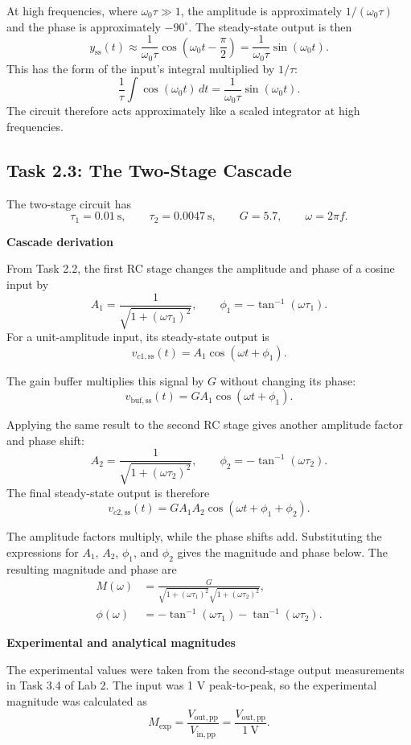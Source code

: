 \documentclass[11pt]{article}
\newcommand{\topic}[1]{\Needspace{4\baselineskip}\par\textbf{#1}\par\nopagebreak}
\begin{document}
At high frequencies, where $\omega_0\tau\gg1$, the amplitude is approximately $1/(\omega_0\tau)$ and the phase is approximately $-90^\circ$. The steady-state output is then
\[
  y_{\mathrm{ss}}(t)
  \approx\frac{1}{\omega_0\tau}\cos\left(\omega_0t-\frac{\pi}{2}\right)
  =\frac{1}{\omega_0\tau}\sin(\omega_0t).
\]
This has the form of the input's integral multiplied by $1/\tau$:
\[
  \frac{1}{\tau}\int\cos(\omega_0t)\,dt=\frac{1}{\omega_0\tau}\sin(\omega_0t).
\]
The circuit therefore acts approximately like a scaled integrator at high frequencies.

\clearpage
\subsection{Task 2.3: The Two-Stage Cascade}

The two-stage circuit has
\[
  \tau_1=0.01\ \text{s},\qquad
  \tau_2=0.0047\ \text{s},\qquad
  G=5.7,\qquad
  \omega=2\pi f.
\]

\topic{Cascade derivation}

From Task 2.2, the first RC stage changes the amplitude and phase of a cosine input by
\[
  A_1=\frac{1}{\sqrt{1+(\omega\tau_1)^2}},\qquad
  \phi_1=-\tan^{-1}(\omega\tau_1).
\]
For a unit-amplitude input, its steady-state output is
\[
  v_{c1,\mathrm{ss}}(t)=A_1\cos(\omega t+\phi_1).
\]

The gain buffer multiplies this signal by $G$ without changing its phase:
\[
  v_{\mathrm{buf,ss}}(t)=GA_1\cos(\omega t+\phi_1).
\]

Applying the same result to the second RC stage gives another amplitude factor and phase shift:
\[
  A_2=\frac{1}{\sqrt{1+(\omega\tau_2)^2}},\qquad
  \phi_2=-\tan^{-1}(\omega\tau_2).
\]
The final steady-state output is therefore
\[
  v_{c2,\mathrm{ss}}(t)=GA_1A_2\cos(\omega t+\phi_1+\phi_2).
\]

The amplitude factors multiply, while the phase shifts add. Substituting the expressions for $A_1$, $A_2$, $\phi_1$, and $\phi_2$ gives the magnitude and phase below. The resulting magnitude and phase are
\begin{align*}
  M(\omega)    &=\frac{G}{\sqrt{1+(\omega\tau_1)^2}\sqrt{1+(\omega\tau_2)^2}},\\
  \phi(\omega) &=-\tan^{-1}(\omega\tau_1)-\tan^{-1}(\omega\tau_2).
\end{align*}

\topic{Experimental and analytical magnitudes}

The experimental values were taken from the second-stage output measurements in Task 3.4 of Lab 2. The input was 1 V peak-to-peak, so the experimental magnitude was calculated as
\[
  M_{\mathrm{exp}}
  =\frac{V_{\mathrm{out,pp}}}{V_{\mathrm{in,pp}}}
  =\frac{V_{\mathrm{out,pp}}}{1\ \text{V}}.
\]
\end{document}
